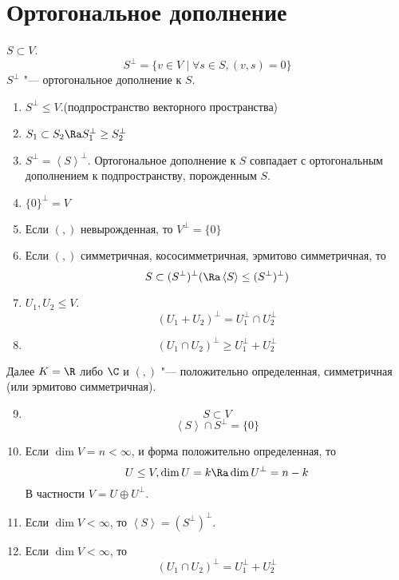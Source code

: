 ﻿\section{Ортогональное дополнение}

\begin{Def}
	$S \subset V$.
	\[ S^\bot = \{v \in V \mid \forall s \in S, (v, s) = 0\} \]
	$S^\bot$ "--- ортогональное дополнение к $S$.
\end{Def}

\begin{conseq}\hfill
	\begin{enumerate}
	\item
		$S^\bot \le V$.(подпространство векторного пространства)

	\item
		$S_1 \subset S_2 \Ra S_1^\bot \ge S_2^\bot$

	\item
		$S^\bot = \left<S\right>^\bot$.
		Ортогональное дополнение к $S$ совпадает
		с ортогональным дополнением к подпространству, порожденным $S$.

	\item
		$\{0\}^\bot = V$

	\item
		Если $(,)$ невырожденная, то $V^\bot = \{0\}$

	\item
		Если $(,)$ симметричная, кососимметричная, эрмитово симметричная, то
		\[ S \subset (S^\bot)^\bot (\Ra \left<S\right> \le (S^\bot)^\bot) \]

	\item
		$U_1, U_2 \le V$.
		\[ (U_1 + U_2)^\bot = U_1^\bot \cap U_2^\bot \]

	\item
		\[ (U_1 \cap U_2)^\bot \ge U_1^\bot + U_2^\bot \]
	\end{enumerate}
	\begin{Rem}
		Далее $K = \R$ либо $\C$ и $(,)$ "--- положительно определенная, симметричная (или эрмитово симметричная).
	\end{Rem}
	\begin{enumerate}
	\setcounter{enumi}{8}
	\item
	$$S \subset V$$
	$$\left<S\right> \cap S^{\bot} = \{0\}$$
	\item
		Если $\dim V = n < \infty$, и форма положительно определенная, то
		\[ U \le V, \dim U = k \Ra \dim U^\bot = n - k \]
		В частности $V = U \oplus U^\bot$.

	\item
		Если $\dim V < \infty$, то $\left<S\right> = (S^\bot)^\bot$.

	\item
		Если $\dim V < \infty$, то
		\[ (U_1 \cap U_2)^\bot = U_1^\bot + U_2^\bot \]
	\end{enumerate}
\end{conseq}
